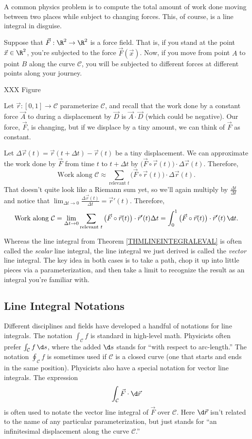 A common physics problem is to compute the total amount of work done
moving between two places while subject to changing forces.  This, of course,
is a line integral in disguise.

Suppose that $\vec F:\R^2\to\R^2$ is a force field.  That is, if you stand at the point
$\vec x\in\R^2$, you're subjected to the force $\vec F(\vec x)$.  Now, 
if you move from point $A$ to point $B$ along the curve $\mathcal C$, you will
be subjected to different forces at different points along your journey.

XXX Figure

Let $\vec r:[0,1]\to\mathcal C$ parameterize $\mathcal C$, and recall that 
the work done by a constant force $\vec A$ to during a displacement by $\vec D$
is $\vec A\cdot \vec D$ (which could be negative).  Our force, $\vec F$,
is changing, but if we displace by a tiny amount, we can think of $\vec F$
as constant.

Let $\Delta \vec r(t) = \vec r(t+\Delta t) - \vec r(t)$ be a tiny displacement.
We can approximate the work done by $\vec F$ from time $t$ to $t+\Delta t$ by
$\big(\vec F\circ \vec r(t)\big) \cdot \Delta\vec r(t)$.  Therefore,
\[
	\text{Work along }\mathcal C \approx \sum_{\text{relevant }t}\big(\vec F\circ \vec r(t)\big) \cdot \Delta\vec r(t).
\]
That doesn't quite look like a Riemann sum yet, so we'll again multiply by $\frac{\Delta t}{\Delta t}$
and notice that $\lim_{\Delta t\to 0}\frac{\Delta\vec r(t)}{\Delta t} = \vec r'(t)$.
Therefore,
\[
	\text{Work along }\mathcal C  =
	\lim_{\Delta t\to 0}\sum_{\text{relevant }t}\big(\vec F\circ \vec r(t)\big) \cdot \vec r'(t)\Delta t
	=\int_0^1 \big(\vec F\circ \vec r(t)\big)\cdot \vec r'(t)\,\d t.
\]

Whereas the line integral from Theorem \ref{THMLINEINTEGRALEVAL} is often
called the \emph{scalar} line integral, the line integral we just derived
is called the \emph{vector} line integral.  The key idea in both cases
is to take a path, chop it up into little pieces via a parameterization, and then
take a limit to recognize the result as an integral you're familiar with.

\subsection{Line Integral Notations}

Different disciplines and fields have developed a handful of notations for line
integrals.  The notation $\int_{\mathcal C} f$ is standard in high-level math.
Physicists often prefer $\int_{\mathcal C}f\,\d s$, where the added $\d s$ stands
for ``with respect to arc-length.''  The notation $\oint_{\mathcal C} f$ is
sometimes used if $\mathcal C$ is a closed curve (one that starts and ends in the same
position).  Physicists also have a special notation for vector line integrals.
The expression
\[
	\int_{\mathcal C} \vec F\cdot \d\vec r
\]
is often used to notate the vector line integral of $\vec F$ over $\mathcal C$.
Here $\d \vec r$ isn't related to the name of any particular parameterization,
but just stands for ``an infinitesimal displacement along the curve $\mathcal C$.''

